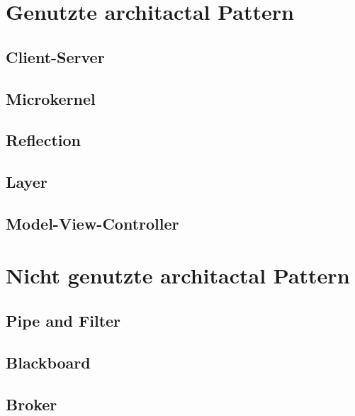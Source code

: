 \section{Genutzte architactal Pattern}
\subsection{Client-Server}

\subsection{Microkernel}

\subsection{Reflection}

\subsection{Layer}

\subsection{Model-View-Controller}

\section{Nicht genutzte architactal Pattern}
\subsection{Pipe and Filter}

\subsection{Blackboard}

\subsection{Broker}
